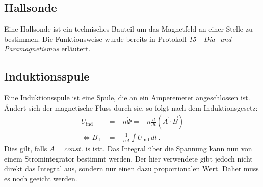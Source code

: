 \documentclass[12pt,a4paper,titlepage,headinclude,bibtotoc]{scrartcl}
\begin{document}
\subsection{Hallsonde}
Eine Hallsonde ist ein technisches Bauteil um das Magnetfeld an einer Stelle zu bestimmen.
Die Funktionsweise wurde bereits in Protokoll \emph{15 - Dia- und Paramagnetismus} erläutert.

\subsection{Induktionsspule}
Eine Induktionsspule ist eine Spule, die an ein Amperemeter angeschlossen ist.
Ändert sich der magnetische Fluss durch sie, so folgt nach dem Induktionsgesetz:
\begin{align}
	U_\text{ind}&=-n\dot\Phi=-n\frac d{dt}(\vec A\cdot\vec B)\\
	\Leftrightarrow B_\perp &=-\frac{1}{nA}\int U_\text{ind}\, dt\,.
\end{align}
Dies gilt, falls $A=const.$ is istt.
Das Integral über die Spannung kann nun von einem Stromintegrator bestimmt werden.
Der hier verwendete gibt jedoch nicht direkt das Integral aus, sondern nur einen dazu proportionalen Wert.
Daher muss es noch geeicht werden.
\end{document}
